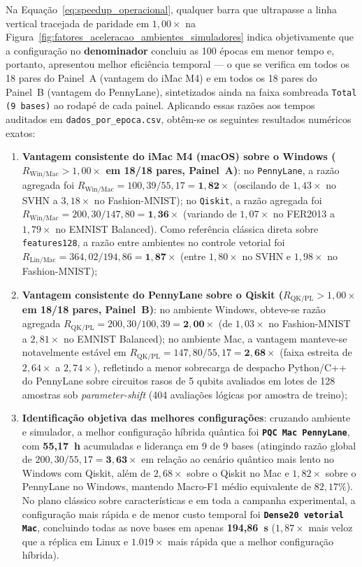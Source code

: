 \documentclass[
    12pt,
    openright,
    oneside,
    a4paper,
    english,
    brazil
]{abntex2}
\begin{document}
Na Equação~\eqref{eq:speedup_operacional}, qualquer barra que ultrapasse a linha vertical tracejada de paridade em \(1{,}00\times\) na Figura~\ref{fig:fatores_aceleracao_ambientes_simuladores} indica objetivamente que a configuração no \textbf{denominador} concluiu as 100 épocas em menor tempo e, portanto, apresentou melhor eficiência temporal --- o que se verifica em todos os 18 pares do Painel~A (vantagem do iMac M4) e em todos os 18 pares do Painel~B (vantagem do PennyLane), sintetizados ainda na faixa sombreada \texttt{Total (9 bases)} ao rodapé de cada painel. Aplicando essas razões aos tempos auditados em \texttt{dados\_por\_epoca.csv}, obtêm-se os seguintes resultados numéricos exatos:
\begin{enumerate}
    \item \textbf{Vantagem consistente do iMac M4 (macOS) sobre o Windows (\(R_{\text{Win/Mac}} > 1{,}00\times\) em 18/18 pares, Painel~A)}: no \texttt{PennyLane}, a razão agregada foi \(R_{\text{Win/Mac}} = 100{,}39 / 55{,}17 = \mathbf{1{,}82\times}\) (oscilando de \(1{,}43\times\) no SVHN a \(3{,}18\times\) no Fashion-MNIST); no \texttt{Qiskit}, a razão agregada foi \(R_{\text{Win/Mac}} = 200{,}30 / 147{,}80 = \mathbf{1{,}36\times}\) (variando de \(1{,}07\times\) no FER2013 a \(1{,}79\times\) no EMNIST Balanced). Como referência clássica direta sobre \texttt{features128}, a razão entre ambientes no controle vetorial foi \(R_{\text{Lin/Mac}} = 364{,}02 / 194{,}86 = \mathbf{1{,}87\times}\) (entre \(1{,}80\times\) no SVHN e \(1{,}98\times\) no Fashion-MNIST);
    \item \textbf{Vantagem consistente do PennyLane sobre o Qiskit (\(R_{\text{QK/PL}} > 1{,}00\times\) em 18/18 pares, Painel~B)}: no ambiente Windows, obteve-se razão agregada \(R_{\text{QK/PL}} = 200{,}30 / 100{,}39 = \mathbf{2{,}00\times}\) (de \(1{,}03\times\) no Fashion-MNIST a \(2{,}81\times\) no EMNIST Balanced); no ambiente Mac, a vantagem manteve-se notavelmente estável em \(R_{\text{QK/PL}} = 147{,}80 / 55{,}17 = \mathbf{2{,}68\times}\) (faixa estreita de \(2{,}64\times\) a \(2{,}74\times\)), refletindo a menor sobrecarga de despacho Python/C++ do PennyLane sobre circuitos rasos de 5 qubits avaliados em lotes de 128 amostras sob \textit{parameter-shift} (404 avaliações lógicas por amostra de treino);
    \item \textbf{Identificação objetiva das melhores configurações}: cruzando ambiente e simulador, a melhor configuração híbrida quântica foi \textbf{\texttt{PQC Mac PennyLane}}, com \textbf{55,17~h} acumuladas e liderança em 9 de 9 bases (atingindo razão global de \(200{,}30 / 55{,}17 = \mathbf{3{,}63\times}\) em relação ao cenário quântico mais lento no Windows com Qiskit, além de \(2{,}68\times\) sobre o Qiskit no Mac e \(1{,}82\times\) sobre o PennyLane no Windows, mantendo Macro-F1 médio equivalente de \(82{,}17\%\)). No plano clássico sobre características e em toda a campanha experimental, a configuração mais rápida e de menor custo temporal foi \textbf{\texttt{Dense20 vetorial Mac}}, concluindo todas as nove bases em apenas \textbf{194,86~s} (\(1{,}87\times\) mais veloz que a réplica em Linux e \(1.019\times\) mais rápida que a melhor configuração híbrida).
\end{enumerate}
\end{document}
